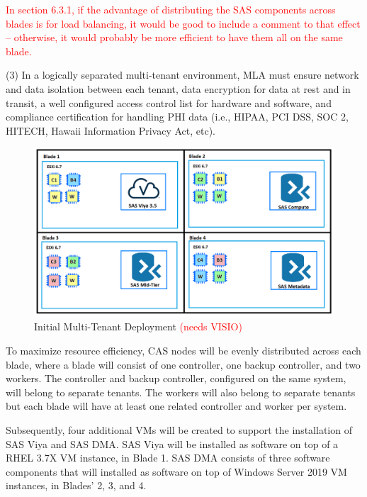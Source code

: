 \textcolor{red}{In section 6.3.1, if the advantage of distributing the SAS components
across blades is for load balancing, it would be good to include a
comment to that effect -- otherwise, it would probably be more efficient
to have them all on the same blade.}

(3) In a logically separated multi-tenant environment, MLA must ensure network and data isolation between each tenant, data encryption for data at rest and in transit, a well configured access control list for hardware and software, and compliance certification for handling PHI data (i.e., HIPAA, PCI DSS, SOC 2, HITECH, Hawaii Information Privacy Act, etc). 

\begin{figure}[H]
    \centering
    \includegraphics[scale = 0.52]{images/initial-deployment-diagram.png}
    \caption{Initial Multi-Tenant Deployment \textcolor{red}{(needs VISIO)} }
    \label{Initial Multi-Tenant Deployment}
\end{figure} 

To maximize resource efficiency, CAS nodes will be evenly distributed across each blade, where a blade will consist of one controller, one backup controller, and two workers. The controller and backup controller, configured on the same system, will belong to separate tenants. The workers will also belong to separate tenants but each blade will have at least one related controller and worker per system. 

Subsequently, four additional VMs will be created to support the installation of SAS Viya and SAS DMA. SAS Viya will be installed as software on top of a RHEL 3.7X VM instance, in Blade 1. SAS DMA consists of three software components that will installed as software on top of Windows Server 2019 VM instances, in Blades' 2, 3, and 4. 

